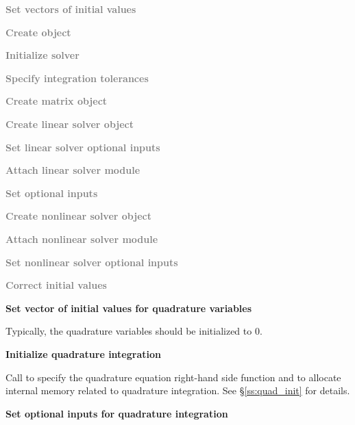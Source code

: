 {\begin{Steps}
\item
  \textcolor{gray}{\bf Set vectors of initial values}

\item\label{i:quad_ida_create}
  \textcolor{gray}{\bf Create {\idas} object}

\item
  \textcolor{gray}{\bf Initialize {\idas} solver}

\item
  \textcolor{gray}{\bf Specify integration tolerances}

\item
  \textcolor{gray}{\bf Create matrix object}

\item
  \textcolor{gray}{\bf Create linear solver object}

\item
  \textcolor{gray}{\bf Set linear solver optional inputs}

\item
  \textcolor{gray}{\bf Attach linear solver module}

\item
  \textcolor{gray}{\bf Set optional inputs}

\item
  \textcolor{gray}{\bf Create nonlinear solver object}

\item
  \textcolor{gray}{\bf Attach nonlinear solver module}

\item
  \textcolor{gray}{\bf Set nonlinear solver optional inputs}

\item
  \textcolor{gray}{\bf Correct initial values}

\item
  {\bf Set vector of initial values for quadrature variables}

  Typically, the quadrature variables should be initialized to $0$.

\item
  {\bf Initialize quadrature integration}

  Call  to specify the quadrature equation right-hand
  side function and to allocate internal memory related to quadrature integration.
  See \S\ref{ss:quad_init} for details.

\item\label{i:quad_optional_inputs}
  {\bf Set optional inputs for quadrature integration}


\end{Steps}}
